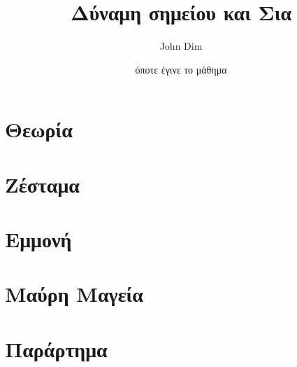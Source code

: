 \documentclass{article}
\title{Δύναμη σημείου και Σια}
\author{John Dim}
\date{όποτε έγινε το μάθημα}
\begin{document}
\maketitle 

\section*{Θεωρία} 

\section*{Ζέσταμα}

\section*{Εμμονή}

\section*{Μαύρη Μαγεία}

\section*{Παράρτημα}
\end{document}
